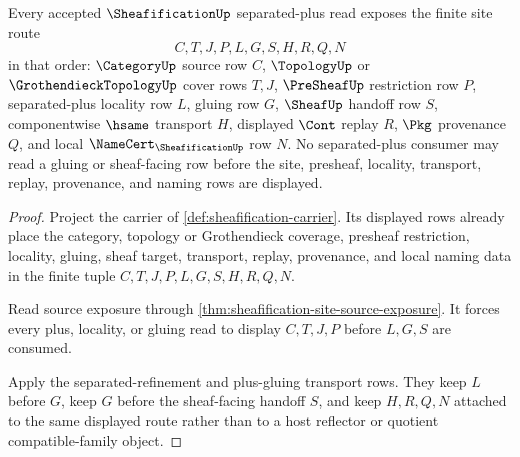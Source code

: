 \begin{theorem}
\label{thm:sheafification-separated-plus-site-route}
Every accepted $\SheafificationUp$ separated-plus read exposes the finite site route
$$
C,T,J,P,L,G,S,H,R,Q,N
$$
in that order: $\CategoryUp$ source row $C$, $\TopologyUp$ or $\GrothendieckTopologyUp$ cover rows $T,J$, $\PreSheafUp$ restriction row $P$, separated-plus locality row $L$, gluing row $G$, $\SheafUp$ handoff row $S$, componentwise $\hsame$ transport $H$, displayed $\Cont$ replay $R$, $\Pkg$ provenance $Q$, and local $\NameCert_{\SheafificationUp}$ row $N$. No separated-plus consumer may read a gluing or sheaf-facing row before the site, presheaf, locality, transport, replay, provenance, and naming rows are displayed.
\end{theorem}
\begin{proof}
Project the carrier of \autoref{def:sheafification-carrier}. Its displayed rows already place the category, topology or Grothendieck coverage, presheaf restriction, locality, gluing, sheaf target, transport, replay, provenance, and local naming data in the finite tuple $C,T,J,P,L,G,S,H,R,Q,N$.

Read source exposure through \autoref{thm:sheafification-site-source-exposure}. It forces every plus, locality, or gluing read to display $C,T,J,P$ before $L,G,S$ are consumed.

Apply the separated-refinement and plus-gluing transport rows. They keep $L$ before $G$, keep $G$ before the sheaf-facing handoff $S$, and keep $H,R,Q,N$ attached to the same displayed route rather than to a host reflector or quotient compatible-family object.
\end{proof}

